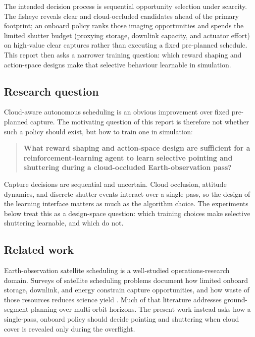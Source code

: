 The intended decision process is sequential opportunity selection under scarcity.
The fisheye reveals clear and cloud-occluded candidates ahead of the primary footprint; an onboard policy ranks those imaging opportunities and spends the limited shutter budget (proxying storage, downlink capacity, and actuator effort) on high-value clear captures rather than executing a fixed pre-planned schedule.
This report then asks a narrower training question: which reward shaping and action-space designs make that selective behaviour learnable in simulation.

\subsection{Research question}
\label{sec:research-question}

Cloud-aware autonomous scheduling is an obvious improvement over fixed pre-planned capture.
The motivating question of this report is therefore not whether such a policy should exist, but how to train one in simulation:
\begin{quote}
  \textbf{What reward shaping and action-space design are sufficient for a reinforcement-learning agent to learn selective pointing and shuttering during a cloud-occluded Earth-observation pass?}
\end{quote}
Capture decisions are sequential and uncertain.
Cloud occlusion, attitude dynamics, and discrete shutter events interact over a single pass, so the design of the learning interface matters as much as the algorithm choice.
The experiments below treat this as a design-space question: which training choices make selective shuttering learnable, and which do not.

\subsection{Related work}
\label{sec:related-work}

Earth-observation satellite scheduling is a well-studied operations-research domain.
Surveys of satellite scheduling problems document how limited onboard storage, downlink, and energy constrain capture opportunities, and how waste of those resources reduces science yield \citep{ferrari2024ssp}.
Much of that literature addresses ground-segment planning over multi-orbit horizons.
The present work instead asks how a single-pass, onboard policy should decide pointing and shuttering when cloud cover is revealed only during the overflight.

